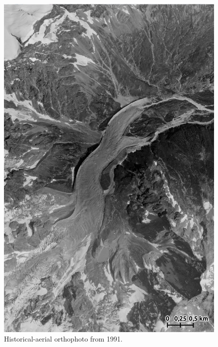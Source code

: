 \begin{figure}[p]
    \centering
    \includegraphics[height=\textheight]{figures/appendix/orto_1991.jpg}
    \caption[]{Historical-aerial orthophoto from 1991.}
\end{figure}

